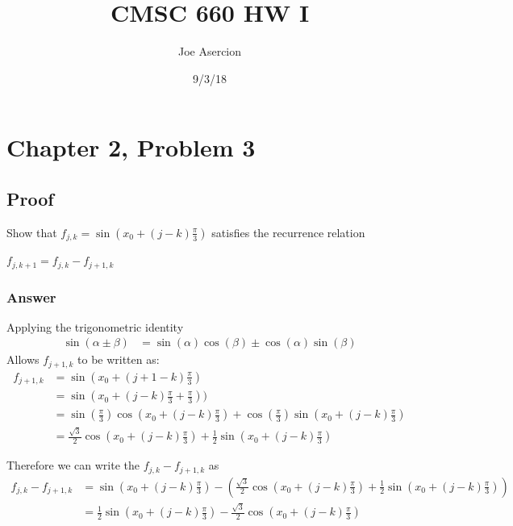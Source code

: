 \documentclass{article}
\title{CMSC 660 HW I}
\date{9/3/18}
\author{Joe Asercion}
\newcommand{\n}{\newline}
\begin{document}
	\maketitle
	\section{Chapter 2, Problem 3}
		\subsection{Proof}
		Show that $f_{j,k}=\sin(x_{0}+(j-k)\frac{\pi}{3})$ satisfies the recurrence relation
		\begin{center}
			$f_{j,k+1}=f_{j,k}-f_{j+1,k}$
		\end{center}
		
		\subsubsection{Answer}
		
		Applying the trigonometric identity\n
		\begin{equation}
			\begin{split}
				\sin(\alpha\pm\beta)&=\sin(\alpha)\cos(\beta)\pm\cos(\alpha)\sin(\beta)
			\end{split}
		\end{equation}
		Allows  $f_{j+1,k}$ to be written as:
		\begin{equation}
			\begin{split}
				f_{j+1,k}&=\sin(x_{0}+(j+1-k)\frac{\pi}{3}) \\
				&=\sin(x_{0}+(j-k)\frac{\pi}{3}+\frac{\pi}{3}))\\
				&=\sin(\frac{\pi}{3})\cos(x_{0}+(j-k)\frac{\pi}{3})+\cos(\frac{\pi}{3})\sin(x_{0}+(j-k)\frac{\pi}{3})\\
				&=\frac{\sqrt{3}}{2}\cos(x_{0}+(j-k)\frac{\pi}{3})+\frac{1}{2}\sin(x_{0}+(j-k)\frac{\pi}{3})
			\end{split}
		\end{equation}
		
		Therefore we can write the $f_{j,k}-f_{j+1,k}$ as 
		\begin{equation}
			\begin{split}
			f_{j,k}-f_{j+1,k} &= \sin(x_{0}+(j-k)\frac{\pi}{3})-(\frac{\sqrt{3}}{2}\cos(x_{0}+(j-k)\frac{\pi}{3})+\frac{1}{2}\sin(x_{0}+(j-k)\frac{\pi}{3})) \\
			&=\frac{1}{2}\sin(x_{0}+(j-k)\frac{\pi}{3})-\frac{\sqrt{3}}{2}\cos(x_{0}+(j-k)\frac{\pi}{3})
			\end{split}
		\end{equation}
		
\end{document}
